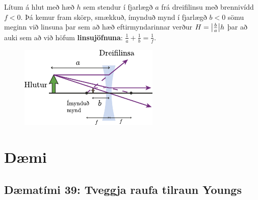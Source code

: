 \ifdefined \wholebook \else\documentclass[oneside]{book}\usepackage{EdlBook}\graphicspath{{figures/}}
\begin{document}
\begin{tcolorbox}
\begin{theorem}
Lítum á hlut með hæð $h$ sem stendur í fjarlægð $a$ frá dreifilinsu með brennivídd $f < 0$. Þá kemur fram skörp, smækkuð, ímynduð mynd í fjarlægð $b < 0$ sömu meginn við linsuna þar sem að hæð eftirmyndarinnar verður $H = \abs{\frac{b}{a}}h$ þar að auki sem að við höfum \textbf{linsujöfnuna}: $ \frac{1}{a} + \frac{1}{b} = \frac{1}{f}$.

\begin{figure}[H]
    \centering
    \includegraphics{figures/dreifilinsa.pdf}
\end{figure}
\end{theorem}
\end{tcolorbox}

\newpage

\section{Dæmi}

\subsection*{Dæmatími 39: Tveggja raufa tilraun Youngs}
\end{document}

